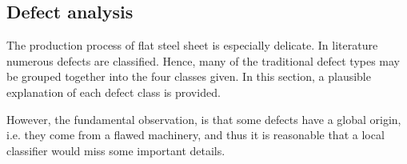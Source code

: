     \subsection{Defect analysis}\label{subsection:defects}
        \par{
            The production process of flat steel sheet is especially delicate. In literature \cite{defects:64common,defects:mainlinemetals} numerous defects are classified. Hence, many of the traditional defect types may be grouped together into the four classes given. In this section, a plausible explanation of each defect class is provided.
        }
        \par{
            However, the fundamental observation, is that some defects have a global origin, i.e. they come from a flawed machinery, and thus it is reasonable that a local classifier would miss some important details.
        }
